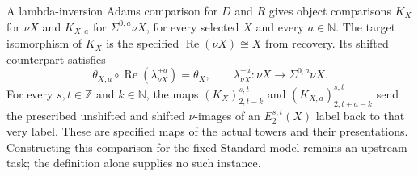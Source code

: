\begin{definition}
\label{sem:Literature:lambda-inversion-adams-comparison}
A lambda-inversion Adams comparison for $D$ and $R$ gives object
comparisons $K_X$ for $\nu X$ and $K_{X,a}$ for
$\Sigma^{0,a}\nu X$, for every selected $X$ and every $a\in\mathbb N$.
The target isomorphism of $K_X$ is the specified
$\operatorname{Re}(\nu X)\cong X$ from recovery. Its shifted counterpart
satisfies
\[
\theta_{X,a}\circ\operatorname{Re}(\lambda^{+a}_{\nu X})=\theta_X,
\qquad \lambda^{+a}_{\nu X}:\nu X\longrightarrow\Sigma^{0,a}\nu X.
\]
For every $s,t\in\mathbb Z$ and $k\in\mathbb N$, the maps
$(K_X)_{2,t-k}^{s,t}$ and $(K_{X,a})_{2,t+a-k}^{s,t}$ send the prescribed unshifted and shifted
$\nu$-images of an $E_2^{s,t}(X)$ label back to that very label.
These are specified maps of the actual towers and their presentations.
Constructing this comparison for the fixed Standard model remains an
upstream task; the definition alone supplies no such instance.
\end{definition}

